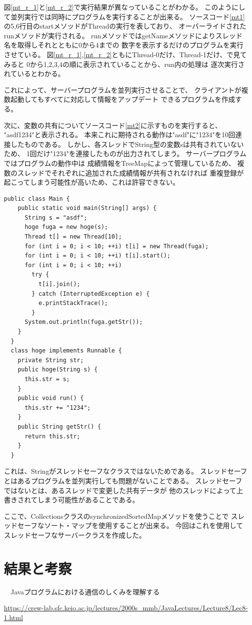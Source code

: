 \documentclass[dvipdfmx]{jsarticle}
\begin{document}
図\ref{mt_r_1}と\ref{mt_r_2}で実行結果が異なっていることがわかる。
このようにして並列実行では同時にプログラムを実行することが出来る。
ソースコード\ref{mt1}の5,6行目のstartメソッドがThreadの実行を表しており、
オーバーライドされたrunメソッドが実行される。
runメソッドではgetNameメソッドによりスレッド名を取得しそれとともに0から4までの
数字を表示するだけのプログラムを実行させている。
図\ref{mt_r_1},\ref{mt_r_2}ともにThread-0だけ、Thread-1だけ、で見てみると
0から1,2,3,4の順に表示されていることから、run内の処理は
逐次実行されているとわかる。

これによって、サーバープログラムを並列実行させることで、
クライアントが複数起動してもすべてに対応して情報をアップデート
できるプログラムを作成する。

次に、変数の共有についてソースコード\ref{mt2}に示すものを実行すると、
"asdf1234"と表示される。
本来これに期待される動作は"asdf"に"1234"を10回連接したものである。
しかし、各スレッドでString型の変数sは共有されていないため、
1回だけ"1234"を連接したものが出力されてしまう。
サーバープログラムではプログラムの動作中は
成績情報をTreeMapによって管理しているため、
複数のスレッドでそれぞれに追加された成績情報が共有されなければ
重複登録が起こってしまう可能性が高いため、これは許容できない。

\begin{lstlisting}[caption=マルチスレッドの例2,label=mt2]
  public class Main {
    public static void main(String[] args) {
      String s = "asdf";
      hoge fuga = new hoge(s);
      Thread t[] = new Thread[10];
      for (int i = 0; i < 10; ++i) t[i] = new Thread(fuga);
      for (int i = 0; i < 10; ++i) t[i].start();
      for (int i = 0; i < 10; ++i)
        try {
          t[i].join();
        } catch (InterruptedException e) {
          e.printStackTrace();
        }
      System.out.println(fuga.getStr());
    }
  }
  class hoge implements Runnable {
    private String str;
    public hoge(String s) {
      this.str = s;
    }
    public void run() {
      this.str += "1234";
    }
    public String getStr() {
      return this.str;
    }
  }
\end{lstlisting}

これは、Stringがスレッドセーフなクラスではないためである。
スレッドセーフとはあるプログラムを並列実行しても問題がないことである。
スレッドセーフではないとは、あるスレッドで変更した共有データが
他のスレッドによって上書きされてしまう可能性があることである。

ここで、CollectionsクラスのsynchronizedSortedMapメソッドを使うことで
スレッドセーフなソート・マップを使用することが出来る。
今回はこれを使用してスレッドセーフなサーバークラスを作成した。

\section{結果と考察}

\begin{thebibliography}{10}
  　Javaプログラムにおける通信のしくみを理解する

  \url{https://crew-lab.sfc.keio.ac.jp/lectures/2000s_mmb/JavaLectures/Lecture8/Lec8-1.html}
\end{thebibliography}
\end{document}
